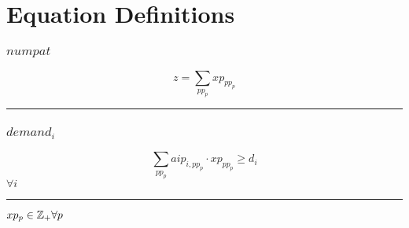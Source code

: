 \documentclass[11pt]{article}
\begin{document}
\section*{Equation Definitions}
\subsubsection*{$numpat$}
\begin{equation}
z = \sum_{pp_{p}} xp_{pp_{p}}
\end{equation}
\vspace{5pt}
\hrule
\subsubsection*{$demand_{i}$}
\begin{equation}
\sum_{pp_{p}} aip_{i,pp_{p}} \cdot xp_{pp_{p}} \geq d_{i}
\end{equation}
\hfill
$
\forall i
$\vspace{5pt}
\hrule
\bigskip
$xp_{p}\in \mathbb{Z}_{+} \forall p\\$
\end{document}
